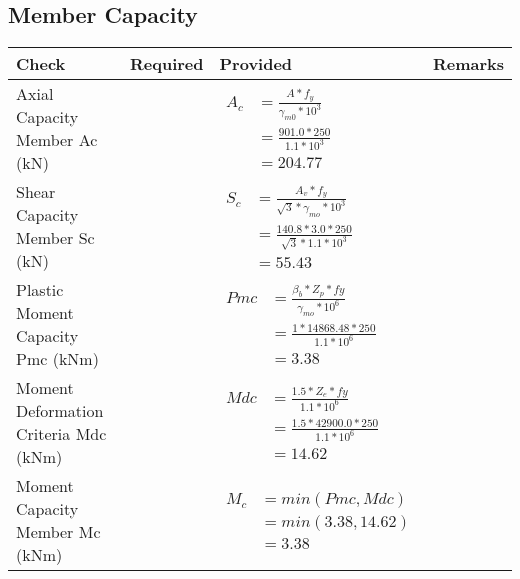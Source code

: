 \documentclass{article}%
\begin{document}
\subsection{Member Capacity}%
\label{subsec:MemberCapacity}%
\renewcommand{\arraystretch}{1.2}%
\begin{longtable}{|p{4cm}|p{5cm}|p{5.5cm}|p{1.5cm}|}%
\hline%
\rowcolor{OsdagGreen}%
Check&Required&Provided&Remarks\\%
\hline%
\endhead%
\hline%
Axial Capacity Member Ac (kN)&&$\begin{aligned} A_c &=\frac{A*f_y}{\gamma_{m0} *10^3}\\ &=\frac{901.0*250}{1.1* 10^3}\\ &=204.77\end{aligned}$&\\%
\hline%
Shear Capacity Member Sc (kN)&&$\begin{aligned} S_c &= \frac{A_v*f_y}{\sqrt{3}*\gamma_{mo} *10^3}\\ &=\frac{140.8*3.0*250}{\sqrt{3}*1.1 *10^3}\\ &=55.43\end{aligned}$&\\%
\hline%
Plastic Moment Capacity Pmc (kNm)&&$\begin{aligned} Pmc &= \frac{\beta_b * Z_p *fy}{\gamma_{mo} * 10^6}\\ &=\frac{1*14868.48*250}{1.1 * 10^6}\\ &=3.38\end{aligned}$&\\%
\hline%
Moment Deformation Criteria Mdc (kNm)&&$\begin{aligned} Mdc &= \frac{1.5 *Z_e *fy}{1.1* 10^6}\\ &= \frac{1.5 *42900.0*250}{1.1* 10^6}\\ &= 14.62\end{aligned}$&\\%
\hline%
Moment Capacity Member Mc (kNm)&&$\begin{aligned} M_c &= min(Pmc,Mdc)\\ &=min(3.38,14.62)\\ &=3.38\end{aligned}$&\\%
\hline%
\end{longtable}

%
\newpage%
\end{document}
